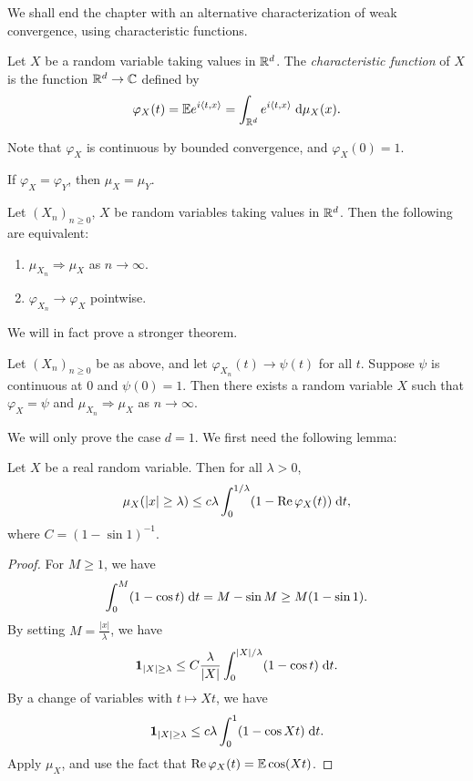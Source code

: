 \documentclass[a4paper]{article}
\begin{document}
We shall end the chapter with an alternative characterization of weak convergence, using characteristic functions.
\begin{defi}
  Let $X$ be a random variable taking values in $\mathbb{R}^d$. The \emph{characteristic function} of $X$ is the function $\mathbb{R}^d \to \mathbb{C}$ defined by
  \[
    \varphi_X(t) = \mathbb{E} e^{i \langle t, x\rangle} = \int_{\mathbb{R}^d} e^{i\langle t, x\rangle}\;\mathrm{d} \mu_X(x).
  \]
\end{defi}
Note that $\varphi_X$ is continuous by bounded convergence, and $\varphi_X(0) = 1$.

\begin{prop}
  If $\varphi_X = \varphi_Y$, then $\mu_X = \mu_Y$.
\end{prop}

\begin{thm}
  Let $(X_n)_{n \geq 0}$, $X$ be random variables taking values in $\mathbb{R}^d$. Then the following are equivalent:
  \begin{enumerate}
    \item $\mu_{X_n} \Rightarrow \mu_X$ as $n \to \infty$.
    \item $\varphi_{X_n} \to \varphi_X$ pointwise.
  \end{enumerate}
\end{thm}
We will in fact prove a stronger theorem.
\begin{thm}[L\'evy]
  Let $(X_n)_{n \geq 0}$ be as above, and let $\varphi_{X_n}(t) \to \psi(t)$ for all $t$. Suppose $\psi$ is continuous at $0$ and $\psi(0) = 1$. Then there exists a random variable $X$ such that $\varphi_X = \psi$ and $\mu_{X_n} \Rightarrow \mu_X$ as $n \to \infty$.
\end{thm}
We will only prove the case $d = 1$. We first need the following lemma:
\begin{lemma}
  Let $X$ be a real random variable. Then for all $\lambda > 0$,
  \[
    \mu_X( |x| \geq \lambda) \leq c \lambda \int_0^{1/\lambda} (1 - \operatorname{Re} \varphi_X(t)) \;\mathrm{d} t,
  \]
  where $C = (1 - \sin 1)^{-1}$.
\end{lemma}

\begin{proof}
  For $M \geq 1$, we have
  \[
    \int_0^M (1 - \cos t)\;\mathrm{d} t = M - \sin M \geq M(1 - \sin 1).
  \]
  By setting $M = \frac{|x|}{\lambda}$, we have
  \[
    \mathbf{1}_{|X| \geq \lambda} \leq C \frac{\lambda}{|X|} \int_0^{|X|/\lambda} (1 - \cos t)\;\mathrm{d} t.
  \]
  By a change of variables with $t \mapsto Xt$, we have
  \[
    \mathbf{1}_{|X| \geq \lambda} \leq c\lambda \int_0^1 (1 - \cos Xt)\;\mathrm{d} t.
  \]
  Apply $\mu_X$, and use the fact that $\operatorname{Re} \varphi_X(t) = \mathbb{E} \cos (Xt)$.
\end{proof}
\end{document}
